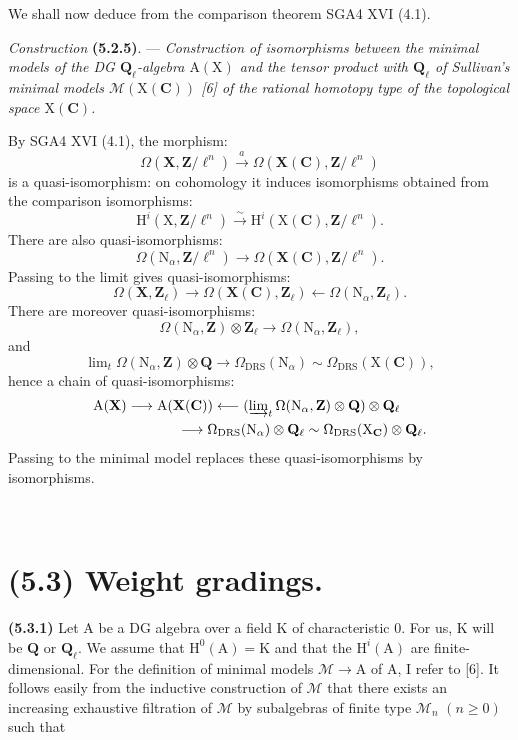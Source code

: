 \documentclass[11pt,leqno]{article}
\newcommand{\Page}[1]{\ifvmode\noindent\else\unskip\ \fi{\footnotesize\textcolor{gray}{[p.\,#1]}}\ \ignorespaces}
\begin{document}
We shall now deduce from the comparison theorem SGA4 XVI (4.1).

\textit{Construction} \textbf{(5.2.5)}. — \textit{Construction of isomorphisms between the minimal models of the \textup{DG} \(\mathbf{Q}_{\ell}\)-algebra \(\mathrm{A}(\mathrm{X})\) and the tensor product with \(\mathbf{Q}_{\ell}\) of Sullivan's minimal models \(\mathcal{M}(\mathrm{X}(\mathbf{C}))\) \textup{[6]} of the rational homotopy type of the topological space \(\mathrm{X}(\mathbf{C})\).}

By SGA4 XVI (4.1), the morphism:
\[
\Omega(\mathbf{X},\mathbf{Z}/\ell^n)
\xrightarrow{a}
\Omega(\mathbf{X}(\mathbf{C}),\mathbf{Z}/\ell^n)
\]
is a quasi-isomorphism: on cohomology it induces isomorphisms obtained from the comparison isomorphisms:
\[
\mathrm{H}^i(\mathrm{X},\mathbf{Z}/\ell^n)
\xrightarrow{\sim}
\mathrm{H}^i(\mathrm{X}(\mathbf{C}),\mathbf{Z}/\ell^n).
\]
There are also quasi-isomorphisms:
\[
\Omega(\mathrm{N}_{\alpha},\mathbf{Z}/\ell^n)
\longrightarrow
\Omega(\mathbf{X}(\mathbf{C}),\mathbf{Z}/\ell^n).
\]
Passing to the limit gives quasi-isomorphisms:
\[
\Omega(\mathbf{X},\mathbf{Z}_{\ell})
\longrightarrow
\Omega(\mathbf{X}(\mathbf{C}),\mathbf{Z}_{\ell})
\longleftarrow
\Omega(\mathrm{N}_{\alpha},\mathbf{Z}_{\ell}).
\]
There are moreover quasi-isomorphisms:
\[
\Omega(\mathrm{N}_{\alpha},\mathbf{Z})\otimes\mathbf{Z}_{\ell}
\longrightarrow
\Omega(\mathrm{N}_{\alpha},\mathbf{Z}_{\ell}),
\]
and
\[
\lim\nolimits_t\Omega(\mathrm{N}_{\alpha},\mathbf{Z})\otimes\mathbf{Q}
\longrightarrow
\Omega_{\mathrm{DRS}}(\mathrm{N}_{\alpha})
\sim
\Omega_{\mathrm{DRS}}(\mathrm{X}(\mathbf{C})),
\]
hence a chain of quasi-isomorphisms:
\[
\begin{aligned}
&\mathrm{A}(\mathbf{X})
\longrightarrow
\mathrm{A}(\mathbf{X}(\mathbf{C}))
\longleftarrow
(\varinjlim\nolimits_t\Omega(\mathrm{N}_{\alpha},\mathbf{Z})\otimes\mathbf{Q})
\otimes\mathbf{Q}_{\ell}\\
&\qquad\qquad\qquad
\longrightarrow
\Omega_{\mathrm{DRS}}(\mathrm{N}_{\alpha})\otimes\mathbf{Q}_{\ell}
\sim
\Omega_{\mathrm{DRS}}(\mathrm{X}_{\mathbf{C}})\otimes\mathbf{Q}_{\ell}.
\end{aligned}
\]
Passing to the minimal model replaces these quasi-isomorphisms by isomorphisms.

\Page{240}
\section*{(5.3) Weight gradings.}

\textbf{(5.3.1)} Let \(\mathrm{A}\) be a DG algebra over a field \(\mathrm{K}\) of characteristic \(0\). For us, \(\mathrm{K}\) will be \(\mathbf{Q}\) or \(\mathbf{Q}_{\ell}\). We assume that \(\mathrm{H}^0(\mathrm{A})=\mathrm{K}\) and that the \(\mathrm{H}^i(\mathrm{A})\) are finite-dimensional. For the definition of minimal models \(\mathcal{M}\to\mathrm{A}\) of \(\mathrm{A}\), I refer to [6]. It follows easily from the inductive construction of \(\mathcal{M}\) that there exists an increasing exhaustive filtration of \(\mathcal{M}\) by subalgebras of finite type \(\mathcal{M}_n\) \((n\geq0)\) such that
\end{document}
